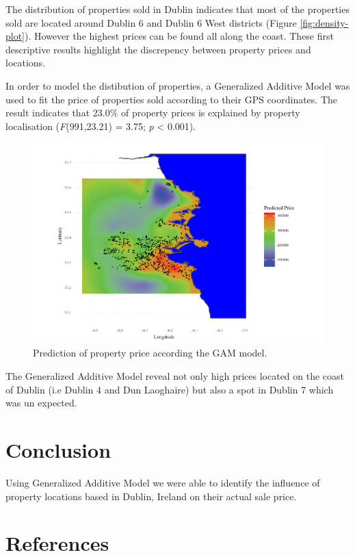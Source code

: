 \documentclass[]{elsarticle} %
\begin{document}
The distribution of properties sold in Dublin indicates that most of the
properties sold are located around Dublin 6 and Dublin 6 West districts
(Figure \ref{fig:density-plot}). However the highest prices can be found
all along the coast. These first descriptive results highlight the
discrepency between property prices and locations.

In order to model the distibution of properties, a Generalized Additive
Model was used to fit the price of properties sold according to their
GPS coordinates. The result indicates that 23.0\% of property prices is
explained by property localisation (\emph{F}(991,23.21) = 3.75; \emph{p}
\textless{} 0.001).

\begin{figure}[H]

\includegraphics{property_price_paper_files/figure-latex/gam-plot-1} \hfill{}

\caption{Prediction of property price according the GAM model.}\label{fig:gam-plot}
\end{figure}

The Generalized Additive Model reveal not only high prices located on
the coast of Dublin (i.e Dublin 4 and Dun Laoghaire) but also a spot in
Dublin 7 which was un expected.

\section{Conclusion}\label{conclusion}

Using Generalized Additive Model we were able to identify the influence
of property locations based in Dublin, Ireland on their actual sale
price.

\section*{References}\label{references}
\end{document}
